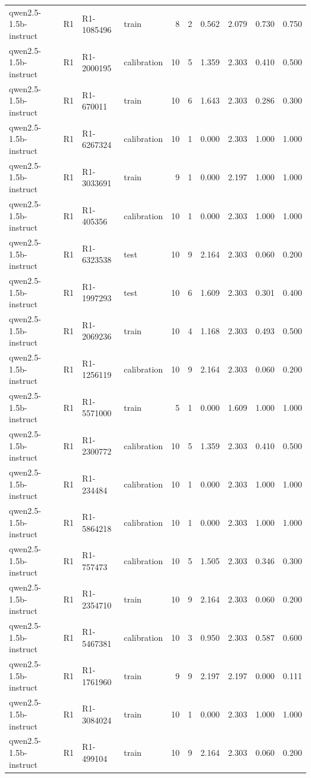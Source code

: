 \begin{table}
\begin{tabular}{llllrrrrrr}
qwen2.5-1.5b-instruct & R1 & R1-1085496 & train & 8 & 2 & 0.562 & 2.079 & 0.730 & 0.750 \\
qwen2.5-1.5b-instruct & R1 & R1-2000195 & calibration & 10 & 5 & 1.359 & 2.303 & 0.410 & 0.500 \\
qwen2.5-1.5b-instruct & R1 & R1-670011 & train & 10 & 6 & 1.643 & 2.303 & 0.286 & 0.300 \\
qwen2.5-1.5b-instruct & R1 & R1-6267324 & calibration & 10 & 1 & 0.000 & 2.303 & 1.000 & 1.000 \\
qwen2.5-1.5b-instruct & R1 & R1-3033691 & train & 9 & 1 & 0.000 & 2.197 & 1.000 & 1.000 \\
qwen2.5-1.5b-instruct & R1 & R1-405356 & calibration & 10 & 1 & 0.000 & 2.303 & 1.000 & 1.000 \\
qwen2.5-1.5b-instruct & R1 & R1-6323538 & test & 10 & 9 & 2.164 & 2.303 & 0.060 & 0.200 \\
qwen2.5-1.5b-instruct & R1 & R1-1997293 & test & 10 & 6 & 1.609 & 2.303 & 0.301 & 0.400 \\
qwen2.5-1.5b-instruct & R1 & R1-2069236 & train & 10 & 4 & 1.168 & 2.303 & 0.493 & 0.500 \\
qwen2.5-1.5b-instruct & R1 & R1-1256119 & calibration & 10 & 9 & 2.164 & 2.303 & 0.060 & 0.200 \\
qwen2.5-1.5b-instruct & R1 & R1-5571000 & train & 5 & 1 & 0.000 & 1.609 & 1.000 & 1.000 \\
qwen2.5-1.5b-instruct & R1 & R1-2300772 & calibration & 10 & 5 & 1.359 & 2.303 & 0.410 & 0.500 \\
qwen2.5-1.5b-instruct & R1 & R1-234484 & calibration & 10 & 1 & 0.000 & 2.303 & 1.000 & 1.000 \\
qwen2.5-1.5b-instruct & R1 & R1-5864218 & calibration & 10 & 1 & 0.000 & 2.303 & 1.000 & 1.000 \\
qwen2.5-1.5b-instruct & R1 & R1-757473 & calibration & 10 & 5 & 1.505 & 2.303 & 0.346 & 0.300 \\
qwen2.5-1.5b-instruct & R1 & R1-2354710 & train & 10 & 9 & 2.164 & 2.303 & 0.060 & 0.200 \\
qwen2.5-1.5b-instruct & R1 & R1-5467381 & calibration & 10 & 3 & 0.950 & 2.303 & 0.587 & 0.600 \\
qwen2.5-1.5b-instruct & R1 & R1-1761960 & train & 9 & 9 & 2.197 & 2.197 & 0.000 & 0.111 \\
qwen2.5-1.5b-instruct & R1 & R1-3084024 & train & 10 & 1 & 0.000 & 2.303 & 1.000 & 1.000 \\
qwen2.5-1.5b-instruct & R1 & R1-499104 & train & 10 & 9 & 2.164 & 2.303 & 0.060 & 0.200 \\

\end{tabular}
\end{table}
